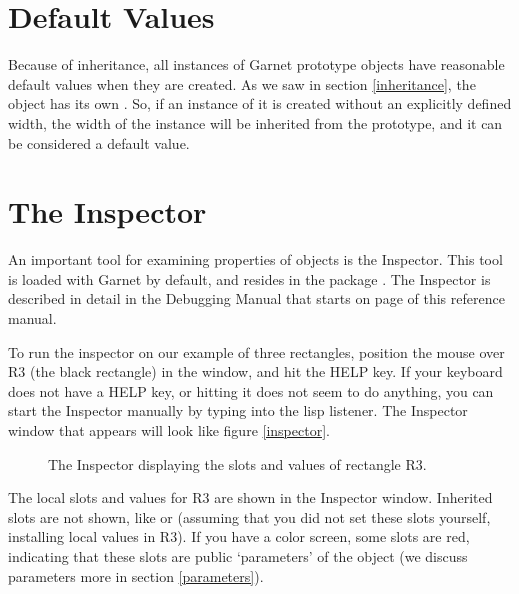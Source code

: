\section{Default Values}

Because of inheritance, all instances of Garnet prototype objects have
reasonable default values when they are created.  As we saw in section
\ref{inheritance}, the
 object has its own .  So, if an
instance of it is created without an explicitly defined width, the
width of the instance will be inherited from the
prototype, and it can be considered a default value.


\section{The Inspector}
\label{inspector-sec}

An important tool for examining properties of objects is the Inspector.
This tool is loaded with Garnet by default, and resides in the package
.  The Inspector is described in detail in the Debugging
Manual that starts on page \value{debug} of this reference manual.

To run the inspector on our example of three rectangles, position the mouse
over R3 (the black rectangle) in the window, and hit the HELP key.  If your
keyboard does not have a HELP key, or hitting it does not seem to do anything,
you can start the Inspector manually by typing  into
the lisp listener.  The Inspector window that appears will look like figure
\ref{inspector}.

\begin{figure}
\begin{center}
\end{center}
\caption{The Inspector displaying the slots and values of rectangle R3.}
\end{figure}

The local slots and values for R3 are shown in the Inspector window.
Inherited slots are not shown, like  or  (assuming
that you did not set these slots yourself, installing local values in R3).
If you have a color screen, some slots are red, indicating that these slots
are public `parameters' of the object (we discuss parameters more in
section \ref{parameters}).

